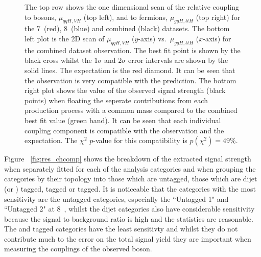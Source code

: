 \begin{figure}
  \caption[Observed best fit values and \NLL scans of the observed bosons couplings to fermions and bosons respectively]{The top row shows the one dimensional \NLL scan of the \SM relative coupling to bosons, $\mu_{qqH,VH}$ (top left), and to fermions, $\mu_{ggH,ttH}$ (top right) for the 7~\TeV (red), 8~\TeV (blue) and combined (black) datasets. The bottom left plot is the 2D \NLL scan of $\mu_{qqH,VH}$ ($y$-axis) vs.~$\mu_{ggH,ttH}$ ($x$-axis) for the combined dataset observation. The best fit point is shown by the black cross whilst the $1\sigma$ and $2\sigma$ error intervals are shown by the solid lines. The \SM expectation is the red diamond. It can be seen that the observation is very compatible with the \SM prediction. The bottom right plot shows the value of the observed signal strength (black points) when floating the seperate contributions from each production process with a common mass compared to the combined best fit value (green band). It can be seen that each individual coupling component is compatible with the observation and the \SM expectation. The $\chi^{2}$ $p$-value for this compatibility is $p(\chi^{2})=49\%$.}
  \label{fig:res_rvrf}
\end{figure}

Figure ~\ref{fig:res_chcomp} shows the breakdown of the extracted signal strength when separately fitted for each of the analysis categories and when grouping the categories by their topology into those which are untagged, those which are dijet (or \VBF) tagged, \VH tagged or \ttH tagged. It is noticeable that the categories with the most sensitivity are the untagged categories, especially the ``Untagged 1" and ``Untagged 2" at 8~\TeV, whilst the dijet categories also have considerable sensitivity because the signal to background ratio is high and the statistics are reasonable. The \VH and \ttH tagged categories have the least sensitivty and whilst they do not contribute much to the error on the total signal yield they are important when measuring the couplings of the observed boson.

